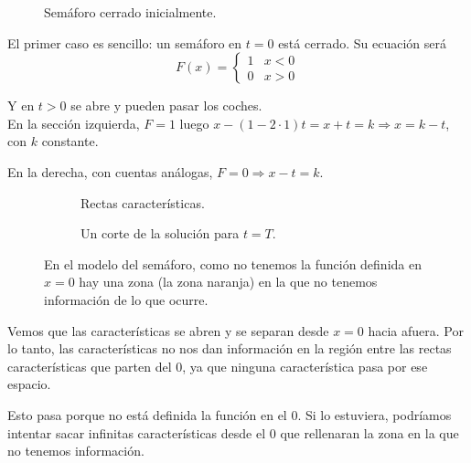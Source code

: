		\begin{example}[Semáforo] \label{ejm:Semaforo}
			\begin{wrapfigure}[8]{L}{0.4\textwidth}
				\centering
				\vspace{-15pt}
				\vspace{-15pt}
				\caption{Semáforo cerrado inicialmente.}
				\label{fig:semaforoCerrado}
			\end{wrapfigure}

			El primer caso es sencillo: un semáforo en $t = 0$ está cerrado. Su ecuación será \[
			F(x) =
			\begin{cases}
				1 & x < 0 \\
				0 & x > 0
			\end{cases}
			\]

			Y en ${t>0}$ se abre y pueden pasar los coches.\\


			En la sección izquierda, $F = 1$ luego $x - (1 - 2·1)t = x + t = k \Rightarrow x = k -t $, con $k$ constante.

			En la derecha, con cuentas análogas, $F = 0 \Rightarrow x-t = k$.

			\begin{figure}[htbp]
				\centering
				\begin{subfigure}[b]{0.49\textwidth}
				\vspace{-8pt}
				\caption{Rectas características.}
				\end{subfigure}
				\begin{subfigure}[b]{0.49\textwidth}
				\caption{Un corte de la solución para $t = T$.}
				\end{subfigure}
				\caption{En el modelo del semáforo, como no tenemos la función definida en $x = 0$ hay una zona (la zona naranja) en la que no tenemos información de lo que ocurre.}
				\label{fig:caracteristicasSemaforo}
			\end{figure}

			Vemos que las características se abren y se separan desde $x=0$ hacia afuera. Por lo tanto, las características no nos dan información en la región entre las rectas características que parten del $0$, ya que ninguna característica pasa por ese espacio.

			Esto pasa porque no está definida la función en el $0$. Si lo estuviera, podríamos intentar sacar infinitas características desde el 0 que rellenaran la zona en la que no tenemos información.

		\end{example}

